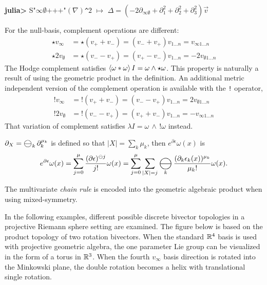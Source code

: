 \documentclass{juliacon}
\DeclareMathOperator*{\bigominus}{\scalerel*{\ominus}{\bigodot}}
\begin{document}

\begin{example}
	\textbf{julia>} S"$\infty\emptyset\text{+++"}(\nabla)$\verb`^`$2 \,\,  \mapsto\, \, \Delta = (-2\partial_{\infty\emptyset} + \partial_1^2 + \partial_2^2 + \partial_3^2)\vec v $
\end{example}
For the null-basis, complement operations are different:
\begin{align*}
	\star v_\infty &= \star(v_++v_-) = (v_- + v_+)v_{1...n} = v_{\infty1...n} \\
 	\star 2v_\emptyset &= \star(v_--v_+) = (v_+ - v_-)v_{1...n} = -2v_{\emptyset1...n}
\end{align*}
The Hodge complement satisfies $\left\langle \omega\ast\omega \right\rangle I=\omega\wedge\star\omega$. This property is naturally a result of using the geometric product in the definition.
An additional metric independent version of the complement operation is available with the \verb`!` operator,
\begin{align*}
	!v_\infty &= !(v_++v_-) = (v_- - v_+)v_{1...n} = 2v_{\emptyset1...n} \\
 	!2v_\emptyset &= !(v_--v_+) = (v_+ + v_-)v_{1...n} = -v_{\infty1...n}
\end{align*}
That variation of complement satisfies $\lambda I = \omega\,\wedge\,!\omega$ instead.

\begin{theorem}
	$\partial_X=\bigominus_k\partial_k^{\mu_k}$ is defined so that $|X|=\sum_k\mu_k$, then $e^{\partial\epsilon}\omega(x)$ is
	\begin{align*}
		e^{\partial\epsilon}\omega(x) =
		\sum_{j=0}^\mu \frac{(\partial\epsilon)^{\ominus j}}{j!}\omega(x)
		= \sum_{j=0}^\mu\sum_{|X|=j} \bigominus_k \frac{(\partial_{k}\epsilon_k(x))^{\mu_{k}}}{\mu_k!}\omega(x).
	\end{align*}
\end{theorem}
The multivariate \textit{chain rule} is encoded into the geometric algebraic product when using mixed-symmetry.


In the following examples, different possible discrete bivector topologies in a projective Riemann sphere setting are examined. 
The figure below is based on the product topology of two rotation bivectors. When the standard $\mathbb{R}^4$ basis is used with projective geometric algebra, the one parameter Lie group can be visualized in the form of a torus in $\mathbb{R}^3$. When the fourth $v_\infty$ basis direction is rotated into the Minkowski plane, the double rotation becomes a helix with translational single rotation.
\end{document}
